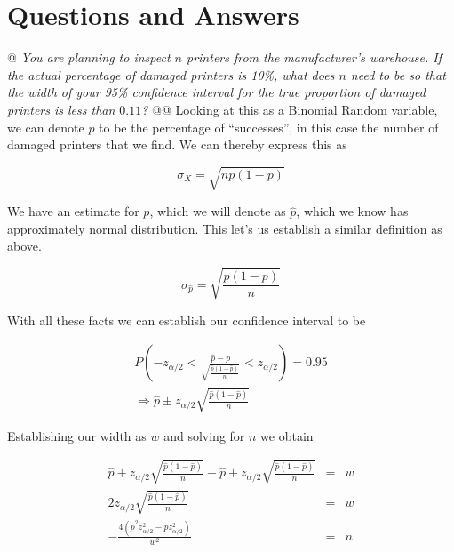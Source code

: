 \documentclass[10pt]{report}\usepackage[]{graphicx}\usepackage[]{xcolor}
\begin{document}
\section{Questions and Answers}
    \begin{easylist}[enumerate]
        @ \textit{You are planning to inspect $n$ printers from the manufacturer's warehouse. If the actual percentage
        of damaged printers is 10\%, what does $n$ need to be so that the width of your 95\% confidence interval for the
        true proportion of damaged printers is less than $0.11$?}
        @@ Looking at this as a Binomial Random variable, we can denote $p$ to be the percentage of ``successes'', in this
        case the number of damaged printers that we find. We can thereby express this as

        \[
            \sigma_X = \sqrt{np (1 - p)}
        \]

        We have an estimate for $p$, which we will denote as $\hat{p}$, which we know has approximately normal
        distribution. This let's us establish a similar definition as above.

        \[
            \sigma_{\hat{p} } = \sqrt{\frac{p(1-p)}{n} }
        \]

        With all these facts we can establish our confidence interval to be

        \[
            \begin{aligned}
                P \left( -z_{\alpha/2} <
                    \frac{\hat{p} - p}{\sqrt{\frac{\hat{p}\left(1-\hat{p}\right)}{n} } } <
                    z_{\alpha/2} \right) = 0.95\\
                \Rightarrow \hat{p} \pm z_{\alpha/2} \sqrt{\frac{\hat{p} (1 - \hat{p})}{n} }
            \end{aligned}
        \]

        Establishing our width as $w$ and solving for $n$ we obtain

        \[
            \begin{aligned}
                \hat{p} + z_{\alpha/2} \sqrt{\frac{\hat{p} (1 - \hat{p})}{n} } -
                    \hat{p} + z_{\alpha/2} \sqrt{\frac{\hat{p} (1 - \hat{p})}{n} } &=& w\\
                2 z_{\alpha/2} \sqrt{\frac{\hat{p} (1 - \hat{p})}{n} } &=& w\\
                -\frac{4 \left(\hat{p}^2 z_{\alpha / 2}^2-\hat{p} z_{\alpha / 2}^2\right)}{w^2} &=& n
            \end{aligned}
        \]


\end{easylist}
\end{document}

